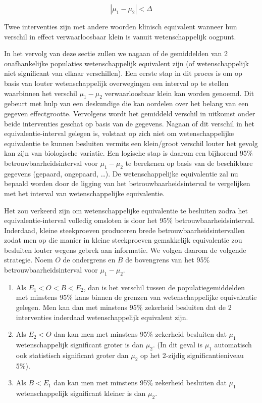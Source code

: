 \documentclass[
  12pt,dutch]{book}
\theoremstyle{definition}
\theoremstyle{definition}
\theoremstyle{definition}
\theoremstyle{definition}
\theoremstyle{remark}
\begin{document}
\begin{equation*}
|\mu_1 - \mu_2| < \Delta
\end{equation*}

Twee interventies zijn met andere woorden klinisch equivalent
wanneer hun verschil in effect verwaarloosbaar klein is vanuit wetenschappelijk
oogpunt.

In het vervolg van deze sectie zullen we nagaan of de gemiddelden van 2 onafhankelijke
populaties wetenschappelijk equivalent zijn (of wetenschappelijk niet significant van elkaar
verschillen). Een eerste stap in dit proces is om op basis van louter
wetenschappelijk overwegingen een interval op te stellen waarbinnen het verschil \(\mu_1-\mu_2\) verwaarloosbaar klein kan worden genoemd. Dit gebeurt met hulp van een deskundige die kan oordelen over het belang van een gegeven
effectgrootte. Vervolgens wordt het gemiddeld verschil in uitkomst onder
beide interventies geschat op basis van de gegevens. Nagaan of dit verschil
in het equivalentie-interval gelegen is, volstaat op zich niet om wetenschappelijke
equivalentie te kunnen besluiten vermits een klein/groot verschil louter
het gevolg kan zijn van biologische variatie. Een logische stap is daarom
een bijhorend 95\% betrouwbaarheidsinterval voor \(\mu_1 - \mu_2\) te berekenen op basis van de beschikbare gegevens (gepaard, ongepaard, \ldots). De wetenschappelijke equivalentie zal nu bepaald worden door de ligging van het
betrouwbaarheidsinterval te vergelijken met het interval van wetenschappelijke
equivalentie.

Het zou verkeerd zijn om wetenschappelijke equivalentie te besluiten zodra het
equivalentie-interval volledig omsloten is door het 95\%
betrouwbaarheidsinterval. Inderdaad, kleine steekproeven produceren brede
betrouwbaarheidsintervallen zodat men op die manier in kleine steekproeven
gemakkelijk equivalentie zou besluiten louter wegens gebrek aan
informatie. We volgen daarom de volgende strategie. Noem \(O\) de ondergrens
en \(B\) de bovengrens van het 95\% betrouwbaarheidsinterval voor \(\mu_1-\mu_2\).

\begin{enumerate}
\def\labelenumi{\arabic{enumi}.}
\item
  Als \(E_1 < O < B < E_2\), dan is het verschil tussen de populatiegemiddelden met minstens 95\% kans binnen de grenzen van wetenschappelijke equivalentie gelegen. Men kan dan met minstens 95\% zekerheid besluiten dat de 2 interventies inderdaad wetenschappelijk equivalent zijn.
\item
  Als \(E_2 < O\) dan kan men met minstens 95\% zekerheid besluiten dat \(\mu_1\) wetenschappelijk significant groter is dan \(\mu_2\). (In dit geval is \(\mu_1\) automatisch ook statistisch significant groter dan \(\mu_2\) op het 2-zijdig significantieniveau 5\%).
\item
  Als \(B < E_1\) dan kan men met minstens 95\% zekerheid besluiten dat \(\mu_1\) wetenschappelijk significant kleiner is dan \(\mu_2.\)
\end{enumerate}
\end{document}
